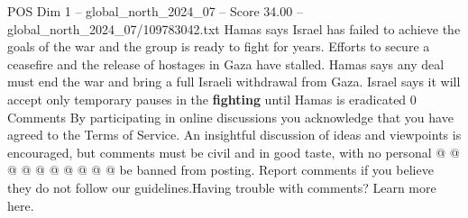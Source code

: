 \begin{textsample}{POS Dim 1 – global\_north\_2024\_07 – Score 34.00 – global\_north\_2024\_07/109783042.txt}
Hamas says Israel has failed to achieve the goals of the war and the group is ready to fight for years.
Efforts to secure a ceasefire and the release of hostages in Gaza have stalled.
Hamas says any deal must end the war and bring a full Israeli withdrawal from Gaza.
Israel says it will accept only temporary pauses in the \textbf{fighting} until Hamas is eradicated 0 Comments By participating in online discussions you acknowledge that you have agreed to the Terms of Service.
An insightful discussion of ideas and viewpoints is encouraged, but comments must be civil and in good taste, with no personal @ @ @ @ @ @ @ @ @ @ be banned from posting.
Report comments if you believe they do not follow our guidelines.Having trouble with comments?
Learn more here.

\end{textsample}
